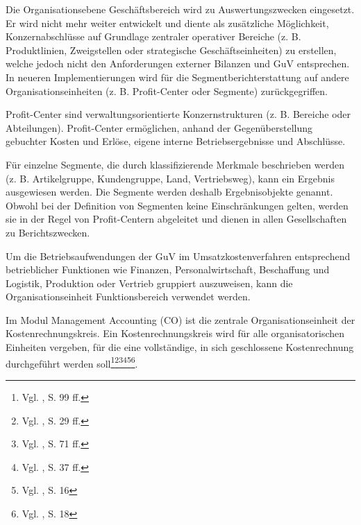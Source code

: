 Die Organisationsebene Geschäftsbereich wird zu Auswertungszwecken eingesetzt. Er wird nicht mehr weiter entwickelt und diente als zusätzliche Möglichkeit, Konzernabschlüsse auf Grundlage zentraler operativer Bereiche (z. B. Produktlinien, Zweigstellen oder strategische Geschäftseinheiten) zu erstellen, welche jedoch nicht den Anforderungen externer Bilanzen und GuV entsprechen. In neueren Implementierungen wird für die Segmentberichterstattung auf andere Organisationseinheiten (z. B. Profit-Center oder Segmente) zurückgegriffen.

Profit-Center sind verwaltungsorientierte Konzernstrukturen (z. B. Bereiche oder Abteilungen). Profit-Center ermöglichen, anhand der Gegenüberstellung gebuchter Kosten und Erlöse, eigene interne Betriebsergebnisse und Abschlüsse.

Für einzelne Segmente, die durch klassifizierende Merkmale beschrieben werden (z. B. Artikelgruppe, Kundengruppe, Land, Vertriebsweg), kann ein Ergebnis ausgewiesen werden. Die Segmente werden deshalb Ergebnisobjekte genannt. Obwohl bei der Definition von Segmenten keine Einschränkungen gelten, werden sie in der Regel von Profit-Centern abgeleitet und dienen in allen Gesellschaften zu Berichtszwecken. 

Um die Betriebsaufwendungen der GuV im Umsatzkostenverfahren entsprechend betrieblicher Funktionen wie Finanzen, Personalwirtschaft, Beschaffung und Logistik, Produktion oder Vertrieb gruppiert auszuweisen, kann die Organisationseinheit Funktionsbereich verwendet werden.

Im Modul Management Accounting (CO) ist die zentrale Organisationseinheit der Kostenrechnungskreis. Ein Kostenrechnungskreis wird für alle organisatorischen Einheiten vergeben, für die eine vollständige, in sich geschlossene Kostenrechnung durchgeführt werden soll\footnote{Vgl. \cite{Hefner2001}, S. 99 ff.}\footnote{Vgl. \cite{Friedl2008}, S. 29 ff.}\footnote{Vgl. \cite{Maassen2006}, S. 71 ff.}\footnote{Vgl. \cite{Patel2009}, S. 37 ff.}\footnote{Vgl. \cite{Padhi2011}, S. 16}\footnote{Vgl. \cite{SAPFI2001}, S. 18}.







